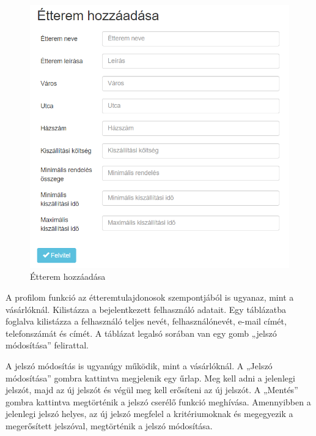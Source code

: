\begin{figure}
\centering
\includegraphics[scale=0.9]{kepek/add_restaurant.png}
\caption{Étterem hozzáadása}
\label{fig:add_restaurant}
\end{figure}


A profilom funkció az étteremtulajdonosok szempontjából is ugyanaz, mint a vásárlóknál. Kilistázza a bejelentkezett felhasználó adatait. Egy táblázatba foglalva kilistázza a felhasználó teljes nevét, felhasználónevét, e-mail címét, telefonszámát és címét. A táblázat legalsó sorában van egy gomb „jelszó módosítása” felirattal.

A jelszó módosítás is ugyanúgy működik, mint a vásárlóknál. A „Jelszó módosítása” gombra kattintva megjelenik egy űrlap. Meg kell adni a jelenlegi jelszót, majd az új jelszót és végül meg kell erősíteni az új jelszót. A „Mentés” gombra kattintva megtörténik a jelszó cserélő funkció meghívása. Amennyibben a jelenlegi jelszó helyes, az új jelszó megfelel a kritériumoknak és megegyezik a megerősített jelszóval, megtörténik a jelszó módosítása.


